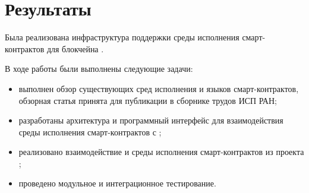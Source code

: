 \section{Результаты}
Была реализована инфраструктура поддержки среды исполнения смарт-контрактов для блокчейна .

В ходе работы были выполнены следующие задачи:
\begin{itemize}
    \item выполнен обзор существующих сред исполнения и языков смарт-контрактов, обзорная статья принята для публикации в сборнике трудов ИСП РАН;
    \item разработаны архитектура и программный интерфейс для взаимодействия среды исполнения смарт-кон\-трак\-тов с ;
    \item реализовано взаимодействие  и среды	 исполнения смарт-кон\-трак\-тов из проекта ;
    \item проведено модульное и интеграционное тестирование.
\end{itemize}
